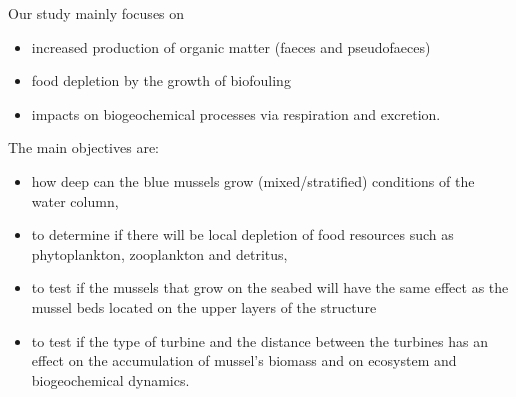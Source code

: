 \documentclass[final,xcolor=dvipsnames]{beamer}
\begin{document}
\begin{frame}
\begin{exampleblock}{}

Our study mainly focuses on 
\begin{itemize}
    \item increased production of organic matter (faeces and pseudofaeces)
    \item food depletion by the growth of biofouling %
    \item impacts on biogeochemical processes via respiration and excretion. 
\end{itemize}
\end{exampleblock}
\end{frame}

\begin{frame}
\begin{exampleblock}{}
The main objectives are: 
\begin{itemize}
    \item how deep can the blue mussels grow  (mixed/stratified)  conditions of the water column,
    \item to determine if there will be local depletion of food resources such as phytoplankton, zooplankton and detritus,
    \item to test if the mussels that grow on the seabed will have the same effect as the mussel beds located on the upper layers of the structure 
    \item to test if the type of turbine and the distance between the turbines has an effect on the accumulation of mussel’s biomass and on ecosystem and biogeochemical dynamics.
\end{itemize}
\end{exampleblock}
\end{frame}
\end{document}
